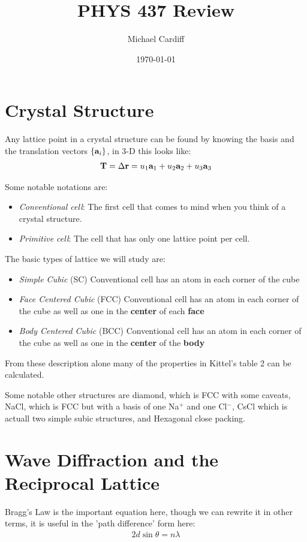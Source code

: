 \documentclass[12pt]{article}
\title{\vspace{-3em}PHYS 437 Review}
\author{Michael Cardiff}
\date{\today}
\begin{document}
\maketitle
\section{Crystal Structure}
Any lattice point in a crystal structure can be found by knowing the basis and the translation vectors $\{\vb{a}_i\}$, in 3-D this looks like:
\begin{align*}
  \vb{T}=\Delta{\vb{r}}=u_1\vb{a}_1+u_2\vb{a}_2+u_3\vb{a}_3
\end{align*}

Some notable notations are:
\begin{itemize}
\item \emph{Conventional cell}: The first cell that comes to mind when you think of a crystal structure. 
\item \emph{Primitive cell}: The cell that has only one lattice point per cell.
\end{itemize}

The basic types of lattice we will study are:
\begin{itemize}
\item \emph{Simple Cubic} (SC) Conventional cell has an atom in each corner of the cube
\item \emph{Face Centered Cubic} (FCC) Conventional cell has an atom in each corner of the cube as well as one in the \textbf{center} of each \textbf{face}
\item \emph{Body Centered Cubic} (BCC) Conventional cell has an atom in each corner of the cube as well as one in the \textbf{center} of the \textbf{body}
\end{itemize}
From these description alone many of the properties in Kittel's table 2 can be calculated.

Some notable other structures are diamond, which is FCC with some caveats, NaCl, which is FCC but with a basis of one Na$^+$ and one Cl$^-$, CsCl which is actuall two simple subic structures, and Hexagonal close packing.
\section{Wave Diffraction and the Reciprocal Lattice}
Bragg's Law is the important equation here, though we can rewrite it in other terms, it is useful in the 'path difference' form here:
\begin{align*}
  2d\sin\theta=n\lambda
\end{align*}
\end{document}
